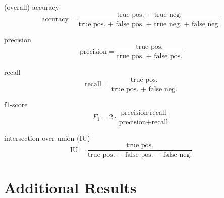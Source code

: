 (overall) accuracy
$$ \text{accuracy} = \frac{\text{true pos. + true neg.}}{\text{true pos. + false pos. + true neg. + false neg.}}$$

precision
$$\text{precision} = \frac{\text{true pos.}}{\text{true pos. + false pos.}}$$

recall
$$\text{recall} = \frac{\text{true pos.}}{\text{true pos. + false neg.}}$$

f1-score
$$F_1 = 2 \cdot \frac{\text{precision} \cdot \text{recall}}{\text{precision}+\text{recall}}$$

intersection over union (IU)
$$ \text{IU} = \frac{\text{true pos.}}{\text{true pos. + false pos. + false neg.}}$$


\section{Additional Results}

